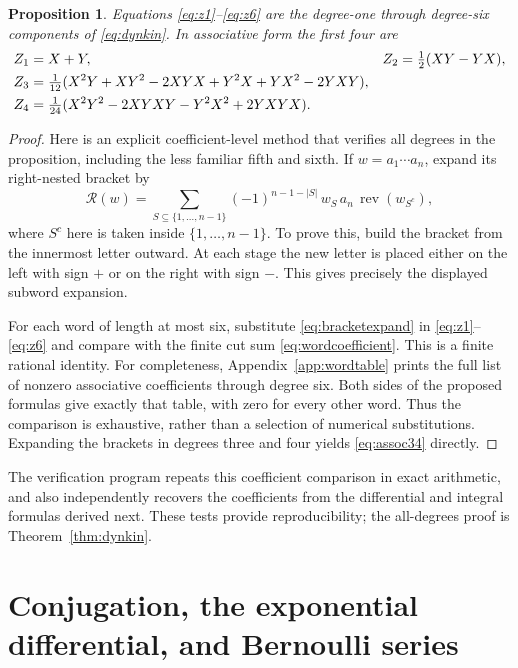 \documentclass[11pt]{article}
\newtheorem{proposition}[theorem]{Proposition}
\theoremstyle{definition}
\theoremstyle{remark}
\newcommand{\Rbr}{\mathcal R}
\numberwithin{equation}{section}
\begin{document}
\begin{proposition}\label{prop:lowdegrees}
Equations \eqref{eq:z1}--\eqref{eq:z6} are the degree-one through degree-six components of \eqref{eq:dynkin}. In associative form the first four are
\begin{align}
 Z_1={}&X+Y, & Z_2={}&\tfrac12(XY-YX),\notag\\
 Z_3={}&\tfrac1{12}(X^2Y+XY^2-2XYX+Y^2X+YX^2-2YXY),\label{eq:assoc34}\\
 Z_4={}&\tfrac1{24}(X^2Y^2-2XYXY-Y^2X^2+2YXYX).\notag
\end{align}
\end{proposition}
\begin{proof}
Here is an explicit coefficient-level method that verifies all degrees in the proposition, including the less familiar fifth and sixth. If $w=a_1\cdots a_n$, expand its right-nested bracket by
\begin{equation}\label{eq:bracketexpand}
 \Rbr(w)=\sum_{S\subseteq\{1,\ldots,n-1\}}
 (-1)^{n-1-|S|}\,w_S\,a_n\,\operatorname{rev}(w_{S^c}),
\end{equation}
where $S^c$ here is taken inside $\{1,\ldots,n-1\}$. To prove this, build the bracket from the innermost letter outward. At each stage the new letter is placed either on the left with sign $+$ or on the right with sign $-$. This gives precisely the displayed subword expansion.

For each word of length at most six, substitute \eqref{eq:bracketexpand} in \eqref{eq:z1}--\eqref{eq:z6} and compare with the finite cut sum \eqref{eq:wordcoefficient}. This is a finite rational identity. For completeness, Appendix~\ref{app:wordtable} prints the full list of nonzero associative coefficients through degree six. Both sides of the proposed formulas give exactly that table, with zero for every other word. Thus the comparison is exhaustive, rather than a selection of numerical substitutions. Expanding the brackets in degrees three and four yields \eqref{eq:assoc34} directly.
\end{proof}
The verification program repeats this coefficient comparison in exact arithmetic, and also independently recovers the coefficients from the differential and integral formulas derived next. These tests provide reproducibility; the all-degrees proof is Theorem~\ref{thm:dynkin}.

\section{Conjugation, the exponential differential, and Bernoulli series}\label{sec:differential}
\end{document}
